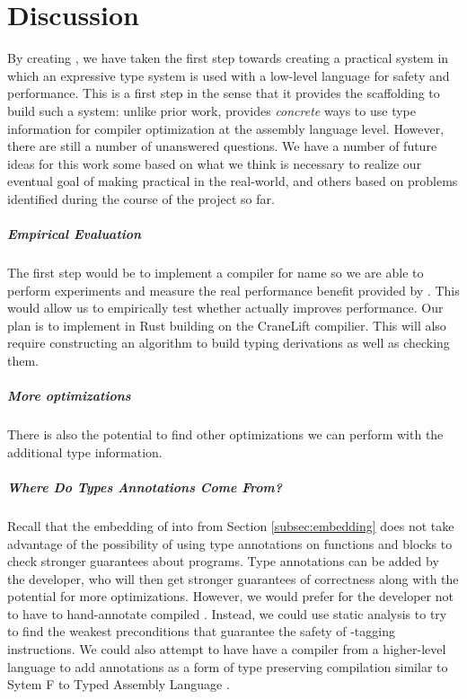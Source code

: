 \chapter{Discussion}
\label{chp:discussion}
 
By creating \name, we have taken the first step towards creating a practical system in which an expressive type system is used with a low-level language for safety and performance.
This is a first step in the sense that it provides the scaffolding to build such a system: unlike prior work, \name provides \emph{concrete} ways to use type information for compiler optimization at the assembly language level.
However, there are still a number of unanswered questions.
We have a number of future ideas for this work some based on what we think is necessary to realize our eventual goal of making \name practical in the real-world, and others based on problems identified during the course of the project so far.

\paragraph{Empirical Evaluation}
The first step would be to implement a compiler for name so we are able to perform experiments and measure the real performance benefit provided by \name.
This would allow us to empirically test whether \name actually improves performance.
Our plan is to implement \name in Rust building on the CraneLift compilier.
This will also require constructing an algorithm to build typing derivations as well as checking them.

\paragraph{More optimizations}
There is also the potential to find other optimizations we can perform with the additional type information.

\paragraph{Where Do Types Annotations Come From?}
Recall that the embedding of \wasm into \name from Section \ref{subsec:embedding} does not take advantage of the possibility of using type annotations on functions and blocks to check stronger guarantees about programs.
Type annotations can be added by the developer, who will then get stronger guarantees of correctness along with the potential for more optimizations.
However, we would prefer for the developer not to have to hand-annotate compiled \wasm.
Instead, we could use static analysis to try to find the weakest preconditions that guarantee the safety of \prechk-tagging instructions.
We could also attempt to have have a compiler from a higher-level language to \wasm add annotations as a form of type preserving compilation similar to Sytem F to Typed Assembly Language \cite{FtoTAL}.

